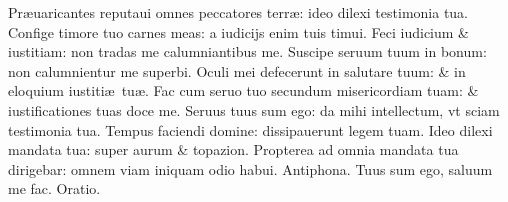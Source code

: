 \documentclass[a5paper,10pt]{book}
\def\ae{æ}
\begin{document}
\begin{multicols*}{2}
\newline \color{red} P\color{black}r\ae uaricantes reputaui omnes peccatores terr\ae : ideo dilexi testimonia tua.
\newline \color{red} C\color{black}onfige timore tuo carnes meas: a iudicijs enim tuis timui.
\newline \color{red} F\color{black}eci iudicium \& iustitiam: non tradas me calumniantibus me.
\newline \color{red} S\color{black}uscipe seruum tuum in bonum: non calumnientur me superbi.
\newline \color{red} O\color{black}culi mei defecerunt in salutare tuum: \& in eloquium iustiti\ae \ tu\ae .
\newline \color{red} F\color{black}ac cum seruo tuo secundum misericordiam tuam: \& iustificationes tuas doce me.
\newline \color{red} S\color{black}eruus tuus sum ego: da mihi intellectum, vt sciam testimonia tua.
\newline \color{red} T\color{black}empus faciendi domine: dissipauerunt legem tuam.
\newline \color{red} I\color{black}deo dilexi mandata tua: super aurum \& topazion.
\newline \color{red} P\color{black}ropterea ad omnia mandata tua dirigebar: omnem viam iniquam odio habui. \quad \color{red} Antiphona. \color{black} Tuus sum ego, saluum me fac. \color{red} Oratio. \color{black}



\end{multicols*}
\end{document}
